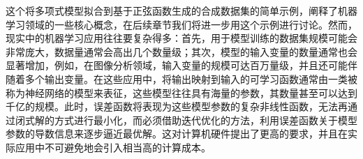 \documentclass[../../main.tex]{subfiles}
\begin{document}
这个将多项式模型拟合到基于正弦函数生成的合成数据集的简单示例，阐释了机器学习领域的一些核心概念，在后续章节我们将进一步用这个示例进行讨论。然而，现实中的机器学习应用往往要复杂得多：首先，用于模型训练的数据集规模可能会非常庞大，数据量通常会高出几个数量级；其次，模型的输入变量的数量通常也会显著增加，例如，在图像分析领域，输入变量的规模可达百万量级，并且还可能伴随着多个输出变量。在这些应用中，将输出映射到输入的可学习函数通常由一类被称为神经网络的模型来表征，这些模型往往具有海量的参数，其数量甚至可以达到千亿的规模。此时，误差函数将表现为这些模型参数的复杂非线性函数，无法再通过闭式解的方式进行最小化，而必须借助迭代优化的方法，利用误差函数关于模型参数的导数信息来逐步逼近最优解。这对计算机硬件提出了更高的要求，并且在实际应用中不可避免地会引入相当高的计算成本。
\end{document}
